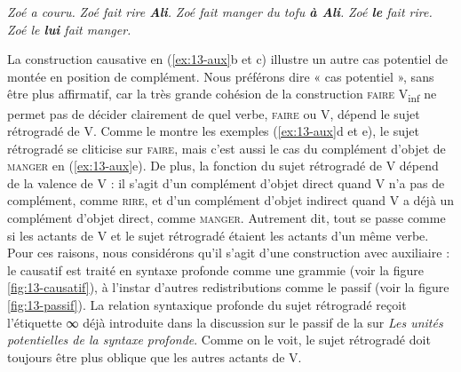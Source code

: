 \ea\label{ex:13-aux}
\ea \textit{Zoé a couru.}
\ex \textit{Zoé fait rire \textbf{Ali}.}
\ex \textit{Zoé fait manger du tofu \textbf{à Ali}.}
\ex \textit{Zoé \textbf{le} fait rire.}
\ex \textit{Zoé le \textbf{lui} fait manger.}\z\z

La construction causative en (\ref{ex:13-aux}b et c) illustre un autre cas potentiel de montée en position de complément. Nous préférons dire « cas potentiel », sans être plus affirmatif, car la très grande cohésion de la construction \textsc{faire} V\textsubscript{inf} ne permet pas de décider clairement de quel verbe, \textsc{faire} ou V, dépend le sujet rétrogradé de V. Comme le montre les exemples (\ref{ex:13-aux}d et e), le sujet rétrogradé se cliticise sur \textsc{faire}, mais c’est aussi le cas du complément d’objet de \textsc{manger} en (\ref{ex:13-aux}e). De plus, la fonction du sujet rétrogradé de V dépend de la valence de V : il s’agit d’un complément d’objet direct quand V n’a pas de complément, comme \textsc{rire}, et d’un complément d’objet indirect quand V a déjà un complément d’objet direct, comme \textsc{manger}. Autrement dit, tout se passe comme si les actants de V et le sujet rétrogradé étaient les actants d'un même verbe. Pour ces raisons, nous considérons qu’il s’agit d’une construction avec auxiliaire : le causatif est traité en syntaxe profonde comme une grammie (voir la figure \ref{fig:13-causatif}), à l’instar d’autres redistributions comme le passif (voir la figure \ref{fig:13-passif}). La relation syntaxique profonde du sujet rétrogradé reçoit l’étiquette ∞ déjà introduite dans la discussion sur le passif de la  sur \textit{Les unités potentielles de la syntaxe profonde}. Comme on le voit, le sujet rétrogradé doit toujours être plus oblique que les autres actants de V.

